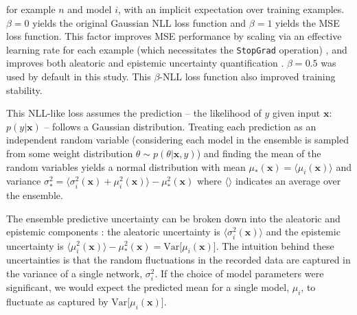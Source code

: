 for example $n$ and model $i$, with an implicit expectation over training examples. $\beta=0$ yields the original Gaussian NLL loss function and $\beta=1$ yields the MSE loss function. This factor improves MSE performance by scaling via an effective learning rate for each example (which necessitates the \texttt{StopGrad} operation) \cite{seitzer_pitfalls_2022}, and improves both aleatoric and epistemic uncertainty quantification \cite{valdenegro-toro_deeper_2022}. $\beta=0.5$ was used by default in this study. This $\beta$-NLL loss function also improved training stability.

This NLL-like loss assumes the prediction -- the likelihood of $y$ given input $\mathbf{x}$: $p(y|\mathbf{x})$ -- follows a Gaussian distribution. Treating each prediction as an independent random variable (considering each model in the ensemble is sampled from some weight distribution $\theta \sim p(\theta | \mathbf{x}, y)$) and finding the mean of the random variables yields a normal distribution with mean $\mu_* (\mathbf{x}) = \langle \mu_i(\mathbf{x}) \rangle $ and variance $\sigma^2_* = \langle \sigma^2_i(\mathbf{x}) + \mu^2_i(\mathbf{x}) \rangle - \mu^2_* (\mathbf{x})$ where $\langle \rangle$ indicates an average over the ensemble.

The ensemble predictive uncertainty can be broken down into the aleatoric and epistemic components \cite{valdenegro-toro_deeper_2022}: the aleatoric uncertainty is $\langle \sigma^2_i (\mathbf{x}) \rangle$ and the epistemic uncertainty is $\langle \mu^2_i (\mathbf{x}) \rangle - \mu^2_* (\mathbf{x}) = \text{Var}\lbrack\mu_i (\mathbf{x}) \rbrack$. The intuition behind these uncertainties is that the random fluctuations in the recorded data are captured in the variance of a single network, $\sigma^2_i$. If the choice of model parameters were significant, we would expect the predicted mean for a single model, $\mu_i$, to fluctuate as captured by $\text{Var}\lbrack\mu_i (\mathbf{x}) \rbrack$. 



